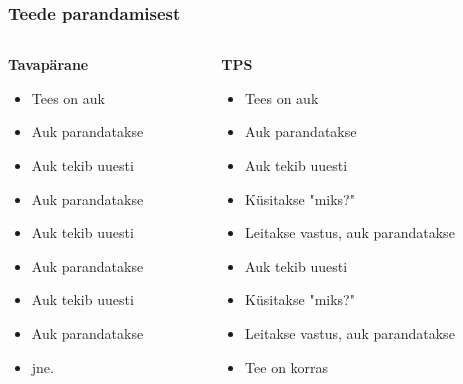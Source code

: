 \begin{frame}[fragile]
  \frametitle{Teede parandamisest}
    	\begin{columns}[t]
		\begin{column}[T]{4.5cm}
			\textbf{Tavapärane}
			\begin{itemize}
				\item Tees on auk 
				\item Auk parandatakse
				\item Auk tekib uuesti
				\item Auk parandatakse
				\item Auk tekib uuesti
				\item Auk parandatakse
				\item Auk tekib uuesti
				\item Auk parandatakse
				\item jne.
			\end{itemize}
		\end{column}
		\begin{column}[T]{6cm}
			\textbf{TPS}
			\begin{itemize}
				\item Tees on auk 
				\item Auk parandatakse
				\item Auk tekib uuesti
				\item Küsitakse "miks?"
				\item Leitakse vastus, auk parandatakse
				\item Auk tekib uuesti
				\item Küsitakse "miks?"
				\item Leitakse vastus, auk parandatakse
				\item Tee on korras
			\end{itemize}
		\end{column}
	\end{columns}
  
\end{frame}

